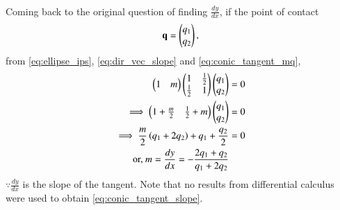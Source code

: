 \begin{enumerate}[label=\thesubsection.\arabic*.,ref=\thesubsection.\theenumi]
\begin{align}
\end{align}
Coming back to the original question of finding $\frac{dy}{dx}$,
if the point of contact
\begin{align}
\mathbf{q} = \begin{pmatrix}q_1\\q_2\end{pmatrix},
\end{align}
from \eqref{eq:ellipse_ips},
\eqref{eq:dir_vec_slope}
and \eqref{eq:conic_tangent_mq},
%
\begin{align}
\begin{pmatrix}1 & m\end{pmatrix}\begin{pmatrix}1 & \frac{1}{2} \\ \frac{1}{2} & 1\end{pmatrix}\begin{pmatrix}q_1\\q_2\end{pmatrix} &= 0
\\
\implies \begin{pmatrix}1 + \frac{m}{2} & \frac{1}{2}+m\end{pmatrix}\begin{pmatrix}q_1\\q_2\end{pmatrix} &=0
\\
\implies \frac{m}{2} \left(q_1+2q_2\right) + q_1 + \frac{q_2}{2} &= 0
\\
\text{or, } m = \frac{dy}{dx}= -\frac{2q_1+q_2}{q_1+2q_2}
\label{eq:conic_tangent_slope}
\end{align}
$\because \frac{dy}{dx}$ is the slope of the tangent.
Note that no results from differential calculus were used to obtain \eqref{eq:conic_tangent_slope}.


\end{enumerate}
